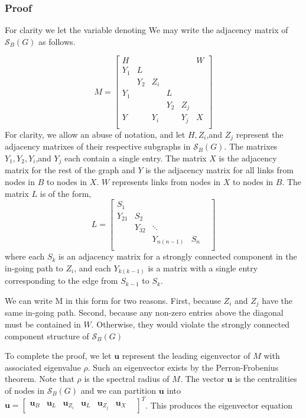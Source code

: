 \documentclass{paper}
\begin{document}
\subsubsection*{Proof} For clarity we let the variable denoting We may write the adjacency matrix of $\mathcal{S}_B(G)$ as follows. 

\[M=
\begin{bmatrix}
H   & & & & & W\\
Y_1 & L & & \\
    & Y_2 & Z_i & \\
Y_1 & & & L \\
   & & & Y_2 & Z_j \\ 
Y  & & Y_i & & Y_j & X \\
\end{bmatrix}
\]
For clarity, we allow an abuse of notation, and let $H,Z_i$,and $Z_j$ represent the adjacency matrixes of their respective subgraphs in $\mathcal{S}_B(G)$. 
The matrixes $Y_1, Y_2, Y_i$,and $Y_j$ each contain a single entry. The matrix $X$ is the adjacency matrix for the rest of the graph and $Y$ is the adjacency matrix for all links from nodes in $B$ to nodes in $X$. $W$ represents links from nodes in $X$ to nodes in $B$. The matrix $L$ is of the form,
\[ L = 
\begin{bmatrix}
S_1 & & & & \\
Y_{21} & S_2 & & \\
    & Y_{32} & \ddots & \\
    & & Y_{n(n-1)}& S_n \\
\end{bmatrix}
\]
where each $S_k$ is an adjacency matrix for a strongly connected component in the in-going path to $Z_i$, and each $Y_{k(k-1)}$ is a matrix with a single entry corresponding to the edge from $S_{k-1}$ to $S_{k}$. 

We can write M in this form for two reasons. First, because $Z_i$ and $Z_j$ have the same in-going path. Second, because any non-zero entries above the diagonal must be contained in $W$. Otherwise, they would violate the strongly connected component structure of $\mathcal{S}_B(G)$ 

To complete the proof, we let $\mathbf{u}$ represent the leading eigenvector of $M$ with associated eigenvalue $\rho$. 
Such an eigenvector exists by the Perron-Frobenius theorem.
Note that $\rho$ is the spectral radius of $M$.
 The vector $\mathbf{u}$ is the centralities of nodes in $\mathcal{S}_B(G)$ and we can partition $\mathbf{u}$ into $\mathbf{u} = 
 \begin{bmatrix}
 \mathbf{u}_B &
\mathbf{u}_{L} &
\mathbf{u}_{Z_i} &
\mathbf{u}_{L} &
\mathbf{u}_{Z_j} &
\mathbf{u}_{X} &
\end{bmatrix}^T$. This produces the eigenvector equation
\end{document}
